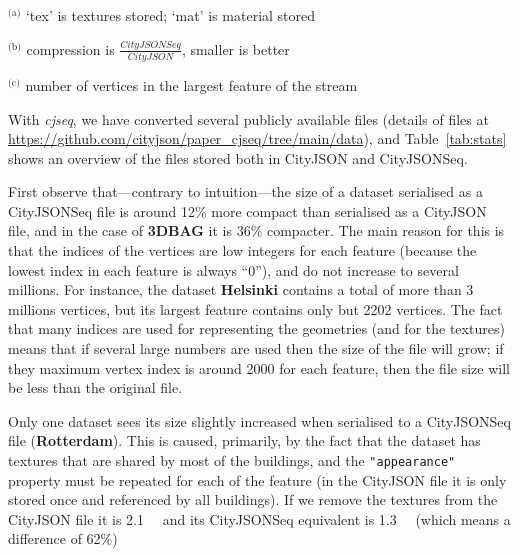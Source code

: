 \documentclass{isprs} %
\begin{document}
\begin{table}
\begin{threeparttable}
\begin{tabular}
    \bottomrule
  \end{tabular}
    \begin{tablenotes}[flushleft]
      \footnotesize
      \item ${}^{\text{(a)}}$ `tex' is textures stored; `mat' is material stored
      \item ${}^{\text{(b)}}$ compression is $\frac{CityJSONSeq}{CityJSON}$, smaller is better
      \item ${}^{\text{(c)}}$ number of vertices in the largest feature of the stream
    \end{tablenotes}
  \end{threeparttable}
\end{table}

With \emph{cjseq}, we have converted several publicly available files (details of files at \url{https://github.com/cityjson/paper_cjseq/tree/main/data}), and Table~\ref{tab:stats} shows an overview of the files stored both in CityJSON and CityJSONSeq.

First observe that---contrary to intuition---the size of a dataset serialised as a CityJSONSeq file is around 12\% more compact than serialised as a CityJSON file, and in the case of \textbf{3DBAG} it is 36\% compacter.
The main reason for this is that the indices of the vertices are low integers for each feature (because the lowest index in each feature is always ``0''), and do not increase to several millions.
For instance, the dataset \textbf{Helsinki} contains a total of more than 3 millions vertices, but its largest feature contains only but 2202 vertices.
The fact that many indices are used for representing the geometries (and for the textures) means that if several large numbers are used then the size of the file will grow; if they maximum vertex index is around 2000 for each feature, then the file size will be less than the original file.

%

Only one dataset sees its size slightly increased when serialised to a CityJSONSeq file (\textbf{Rotterdam}).
This is caused, primarily, by the fact that the dataset has textures that are shared by most of the buildings, and the \texttt{"appearance"} property must be repeated for each of the feature (in the CityJSON file it is only stored once and referenced by all buildings).
If we remove the textures from the CityJSON file it is \qty{2.1}{\mega\byte} and its CityJSONSeq equivalent is \qty{1.3}{\mega\byte} (which means a difference of 62\%)
\end{document}
